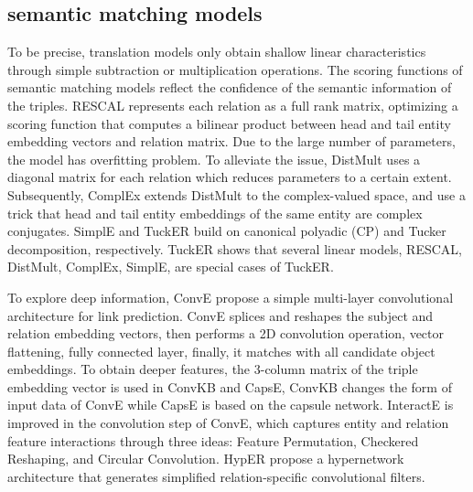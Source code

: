 \documentclass[letterpaper]{article} \usepackage{aaai20}  \usepackage{times}  \usepackage{helvet} \usepackage{courier}  \usepackage[hyphens]{url}  \usepackage{graphicx} \usepackage{lineno,hyperref,amsmath,amssymb}
\begin{document}
\subsection{semantic matching models}
To be precise, translation models only obtain shallow linear characteristics through simple subtraction or multiplication operations. The scoring functions of semantic matching models reflect the confidence of the semantic information of the triples. RESCAL\cite{nickel2011three} represents each relation as a full rank matrix, optimizing a scoring function that computes a bilinear product between head and tail entity embedding vectors and relation matrix. Due to the large number of parameters, the model has overfitting problem. To alleviate the issue, DistMult\cite{yang2014embedding} uses a diagonal matrix for each relation which reduces parameters to a certain extent. Subsequently, ComplEx\cite{trouillon2016complex} extends DistMult to the complex-valued space, and use a trick that head and tail entity embeddings of the same entity are complex conjugates. SimplE\cite{kazemi2018simple} and TuckER\cite{balavzevic2019tucker} build on canonical polyadic (CP) and Tucker decomposition, respectively. TuckER shows that several linear models, RESCAL, DistMult, ComplEx, SimplE, are special cases of TuckER.

To explore deep information, ConvE\cite{dettmers2018convolutional} propose a simple multi-layer convolutional architecture for link prediction. ConvE splices and reshapes the subject and relation embedding vectors, then performs a 2D convolution operation, vector flattening, fully connected layer, finally, it matches with all candidate object embeddings. To obtain deeper features, the 3-column matrix of the triple embedding vector is used in ConvKB\cite{nguyen2017novel} and CapsE\cite{vu2019capsule}, ConvKB changes the form of input data of ConvE while CapsE is based on the capsule network. InteractE\cite{vashishth2020interacte} is improved in the convolution step of ConvE, which captures entity and relation feature interactions through three ideas: Feature Permutation, Checkered Reshaping, and Circular Convolution. HypER\cite{balavzevic2019hypernetwork} propose a hypernetwork architecture that generates simplified relation-specific convolutional filters. 
\end{document}
